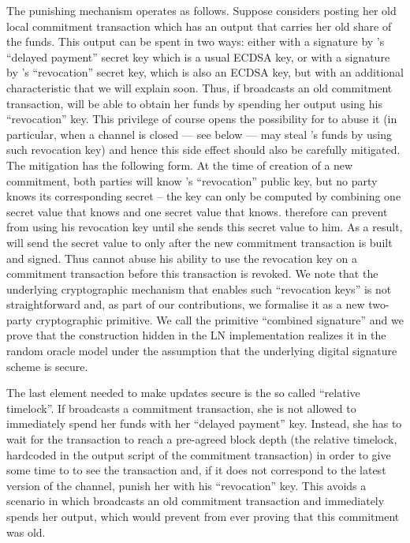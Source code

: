     The punishing mechanism operates as follows. Suppose \alice{} considers
    posting her old local commitment transaction which  has an output that
    carries her old share of the funds. This output can be spent in two ways:
    either with a signature by \alice's ``delayed payment'' secret key which is
    a usual ECDSA key, or with a signature by \bob's ``revocation'' secret key,
    which is also an ECDSA key, but with an additional characteristic that we
    will explain soon. Thus, if \alice{} broadcasts an old commitment
    transaction, \bob{} will be able to obtain her funds by spending her output
    using his ``revocation'' key. This privilege of course opens the possibility
    for \bob{} to abuse it (in particular, when a channel is closed --- see
    below --- \bob{} may steal \alice's funds by using such revocation key) and
    hence this side effect should also be carefully mitigated. The mitigation
    has the following form. At the time of creation of a new commitment, both
    parties will know \bob's ``revocation'' public key, but no party knows its
    corresponding secret -- the key can only be computed by combining one secret
    value that \alice{} knows and one secret value that \bob{} knows. \alice{}
    therefore can prevent \bob{} from using his revocation key until she  sends
    this secret value to him. As a result, \alice{} will send the secret value
    to \bob{} only after the new commitment transaction is built and signed.
    Thus \bob{} cannot abuse his ability to use the revocation key on a
    commitment transaction before this transaction is revoked. We note that the
    underlying cryptographic mechanism  that enables such ``revocation keys''
    is not straightforward and, as part of our contributions, we formalise it as
    a new two-party cryptographic primitive. We call the primitive ``combined
    signature'' and we prove that the construction hidden in the LN
    implementation realizes it in the random oracle model under the assumption
    that the underlying digital signature scheme is secure.

    The last element needed to make updates secure is the so called ``relative
    timelock''. If \alice{} broadcasts a commitment transaction, she is not
    allowed to immediately spend her funds with her ``delayed payment'' key.
    Instead, she has to wait for the transaction to reach a pre-agreed block
    depth (the relative timelock, hardcoded in the output script of the
    commitment transaction) in order to give some time to \bob{} to see the
    transaction and, if it does not correspond to the latest version of the
    channel, punish her with his ``revocation'' key. This avoids a scenario in
    which \alice{} broadcasts an old commitment transaction and immediately
    spends her output, which would prevent \bob{} from ever proving that this
    commitment was old.

